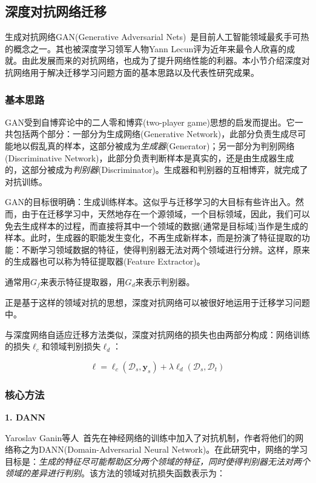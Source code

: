 \subsection{深度对抗网络迁移}

生成对抗网络GAN(Generative Adversarial Nets)~\cite{goodfellow2014generative}是目前人工智能领域最炙手可热的概念之一。其也被深度学习领军人物Yann Lecun评为近年来最令人欣喜的成就。由此发展而来的对抗网络，也成为了提升网络性能的利器。本小节介绍深度对抗网络用于解决迁移学习问题方面的基本思路以及代表性研究成果。

\subsubsection{基本思路}

GAN受到自博弈论中的二人零和博弈(two-player game)思想的启发而提出。它一共包括两个部分：一部分为生成网络(Generative Network)，此部分负责生成尽可能地以假乱真的样本，这部分被成为\textit{生成器}(Generator)；另一部分为判别网络(Discriminative Network)，此部分负责判断样本是真实的，还是由生成器生成的，这部分被成为\textit{判别器}(Discriminator)。生成器和判别器的互相博弈，就完成了对抗训练。

GAN的目标很明确：生成训练样本。这似乎与迁移学习的大目标有些许出入。然而，由于在迁移学习中，天然地存在一个源领域，一个目标领域，因此，我们可以免去生成样本的过程，而直接将其中一个领域的数据(通常是目标域)当作是生成的样本。此时，生成器的职能发生变化，不再生成新样本，而是扮演了特征提取的功能：不断学习领域数据的特征，使得判别器无法对两个领域进行分辨。这样，原来的生成器也可以称为特征提取器(Feature Extractor)。

通常用$G_f$来表示特征提取器，用$G_d$来表示判别器。

正是基于这样的领域对抗的思想，深度对抗网络可以被很好地运用于迁移学习问题中。

与深度网络自适应迁移方法类似，深度对抗网络的损失也由两部分构成：网络训练的损失$\ell_c$和领域判别损失$\ell_d$：

\begin{equation}
	\ell = \ell_c(\mathcal{D}_s,\mathbf{y}_s) + \lambda \ell_d(\mathcal{D}_s,\mathcal{D}_t)
\end{equation}

\subsubsection{核心方法}

\textbf{1. DANN}

Yaroslav Ganin等人~\cite{ganin2016domain}首先在神经网络的训练中加入了对抗机制，作者将他们的网络称之为DANN(Domain-Adversarial Neural Network)。在此研究中，网络的学习目标是：\textit{生成的特征尽可能帮助区分两个领域的特征，同时使得判别器无法对两个领域的差异进行判别}。该方法的领域对抗损失函数表示为：

